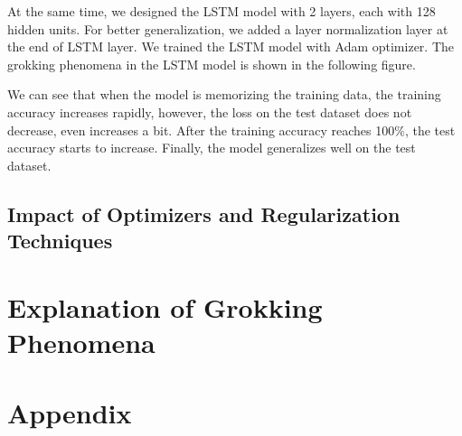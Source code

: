\documentclass{article}
\begin{document}
    At the same time, we designed the LSTM model with 2 layers, each with 128 hidden units. For better generalization, we added a layer normalization layer at the end of LSTM layer. We trained the LSTM model with Adam optimizer. The grokking phenomena in the LSTM model is shown in the following figure.

    We can see that when the model is memorizing the training data, the training accuracy increases rapidly, however, the loss on the test dataset does not decrease, even increases a bit. After the training accuracy reaches 100\%, the test accuracy starts to increase. Finally, the model generalizes well on the test dataset.

    \subsection{Impact of Optimizers and Regularization Techniques}


    \section{Explanation of Grokking Phenomena}

    \appendix


    \section{Appendix}
\end{document}
